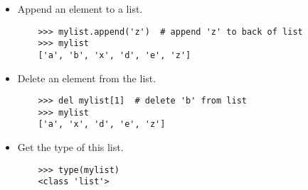 \documentclass{article}
\begin{document}
\begin{itemize}
\begin{lstlisting}
    \end{lstlisting}
    \item Append an element to a list.
    \begin{lstlisting}
    >>> mylist.append('z')  # append 'z' to back of list
    >>> mylist
    ['a', 'b', 'x', 'd', 'e', 'z']
    \end{lstlisting}
    \item Delete an element from the list.
    \begin{lstlisting}
    >>> del mylist[1]  # delete 'b' from list
    >>> mylist
    ['a', 'x', 'd', 'e', 'z']
    \end{lstlisting}
    \item Get the type of this list.
    \begin{lstlisting}
    >>> type(mylist)
    <class 'list'>
    \end{lstlisting}
\end{itemize}
\end{document}
